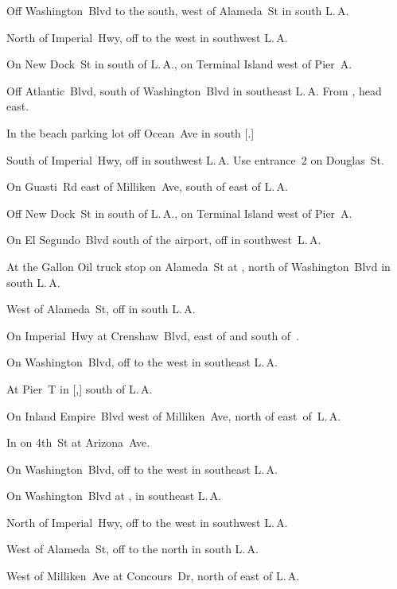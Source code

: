 
\begin{LocationList}

Off Washington~Blvd to the south, west of Alameda~St in south L.\,A.

North of Imperial~Hwy, off  to the west in southwest L.\,A.

On New Dock~St in  south of L.\,A., on Terminal Island west of Pier~A.

Off Atlantic~Blvd, south of Washington~Blvd in southeast L.\,A.
From , head east.

In the beach parking lot off  Ocean~Ave in south [.]

South of Imperial~Hwy, off  in southwest L.\,A.
Use entrance~2 on Douglas~St.

On Guasti~Rd east of Milliken~Ave, south of  east of L.\,A.

Off New Dock~St in  south of L.\,A., on Terminal Island west of Pier~A.

On El Segundo~Blvd south of the airport, off  in southwest~L.\,A.

At the Gallon Oil truck stop on Alameda~St at , north of Washington~Blvd in south L.\,A.

\Location{\GarageHQ \Garage}
West of Alameda~St, off  in south L.\,A.

On Imperial~Hwy at Crenshaw~Blvd, east of  and south of~.

On Washington~Blvd, off  to the west in southeast L.\,A.

At Pier~T in [,] south of L.\,A.

On Inland Empire~Blvd west of Milliken~Ave, north of  east~of~L.\,A.

In  on 4th~St at Arizona~Ave.

On Washington~Blvd, off  to the west in southeast L.\,A.

\Location{\RecruitmentAgency \Recruitment}
On Washington~Blvd at , in southeast L.\,A.

North of Imperial~Hwy, off  to the west in southwest L.\,A.

West of Alameda~St, off  to the north in south L.\,A.

West of Milliken~Ave at Concours~Dr, north of  east of L.\,A.

\end{LocationList}
